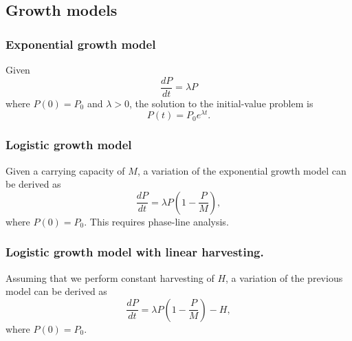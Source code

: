 \documentclass[main.tex]{subfiles}
\begin{document}
	\subsection*{Growth models}
	\subsubsection*{Exponential growth model}
	Given \[\frac{dP}{dt} = \lambda P\] where \(P(0) = P_0\) and \(\lambda > 0\), the solution to the initial-value problem is
	\[P(t) = P_0e^{\lambda t}.\]

	\subsubsection*{Logistic growth model}
	Given a carrying capacity of \(M\), a variation of the exponential growth model can be derived as \[\frac{dP}{dt} = \lambda P \left(1 - \frac{P}{M}\right),\] where \(P(0) = P_0.\) This requires phase-line analysis.

	\subsubsection*{Logistic growth model with linear harvesting.}
	Assuming that we perform constant harvesting of \(H\), a variation of the previous model can be derived as \[\frac{dP}{dt} = \lambda P \left(1 - \frac{P}{M}\right) - H,\] where \(P(0) = P_0.\)


\ifSubfilesClassLoaded{%
\end{multicols}
}{}
\end{document}
